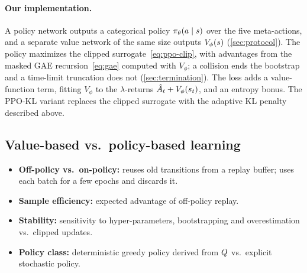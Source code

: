 \paragraph{Our implementation.}
A policy network outputs a categorical policy $\pi_\theta(a \mid s)$ over the five meta-actions, and a
separate value network of the same size outputs $V_\phi(s)$ (\cref{sec:protocol}). The policy maximizes the
clipped surrogate~\eqref{eq:ppo-clip}, with advantages from the masked GAE recursion~\eqref{eq:gae} computed with
$V_\phi$; a collision ends the bootstrap and a time-limit truncation does not (\cref{sec:termination}). The loss adds a
value-function term, fitting $V_\phi$ to the $\lambda$-returns $\hat{A}_t + V_\phi(s_t)$, and an entropy bonus.
The PPO-KL variant replaces the clipped surrogate with the adaptive KL penalty described above.

\subsection{Value-based vs.\ policy-based learning}\label{sec:vb-vs-pb}
\begin{itemize}
  \item \textbf{Off-policy vs.\ on-policy:} \ddqn{} reuses old transitions from a replay buffer; \ppo{} uses each batch for a few epochs and discards it.
  \item \textbf{Sample efficiency:} expected advantage of off-policy replay.
  \item \textbf{Stability:} sensitivity to hyper-parameters, bootstrapping and overestimation vs.\ clipped updates.
  \item \textbf{Policy class:} deterministic greedy policy derived from $Q$ vs.\ explicit stochastic policy.
\end{itemize}
